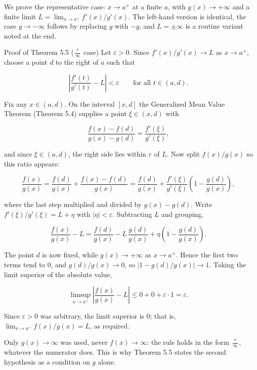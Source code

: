 \documentclass[a4paper,12pt,oneside]{memoir}
\begin{document}
We prove the representative case: \(x \to a^{+}\) at a finite \(a\), with \(g(x) \to +\infty\) and a finite limit \(L = \lim_{x \to a^{+}} f'(x)/g'(x)\). The left-hand version is identical, the case \(g \to -\infty\) follows by replacing \(g\) with \(-g\), and \(L = \pm\infty\) is a routine variant noted at the end.

\begin{envproof}{Proof of Theorem 5.5 (\(\tfrac{\ast}{\infty}\) case)}{}{}
Let \(\varepsilon > 0\). Since \(f'(x)/g'(x) \to L\) as \(x \to a^{+}\), choose a point \(d\) to the right of \(a\) such that

\[ \left\lvert \frac{f'(t)}{g'(t)} - L \right\rvert < \varepsilon \qquad \text{for all } t \in (a, d). \]

Fix any \(x \in (a, d)\). On the interval \([x, d]\) the Generalized Mean Value Theorem (Theorem 5.4) supplies a point \(\xi \in (x, d)\) with

\[ \frac{f(x) - f(d)}{g(x) - g(d)} = \frac{f'(\xi)}{g'(\xi)}, \]

and since \(\xi \in (a, d)\), the right side lies within \(\varepsilon\) of \(L\). Now split \(f(x)/g(x)\) so this ratio appears:

\[ \frac{f(x)}{g(x)} = \frac{f(d)}{g(x)} + \frac{f(x) - f(d)}{g(x)} = \frac{f(d)}{g(x)} + \frac{f'(\xi)}{g'(\xi)}\left(1 - \frac{g(d)}{g(x)}\right), \]

where the last step multiplied and divided by \(g(x) - g(d)\). Write \(f'(\xi)/g'(\xi) = L + \eta\) with \(\lvert \eta \rvert < \varepsilon\). Subtracting \(L\) and grouping,

\[ \frac{f(x)}{g(x)} - L = \frac{f(d)}{g(x)} - L\,\frac{g(d)}{g(x)} + \eta\left(1 - \frac{g(d)}{g(x)}\right). \]

The point \(d\) is now fixed, while \(g(x) \to +\infty\) as \(x \to a^{+}\). Hence the first two terms tend to \(0\), and \(g(d)/g(x) \to 0\), so \(\lvert 1 - g(d)/g(x) \rvert \to 1\). Taking the limit superior of the absolute value,

\[ \limsup_{x \to a^{+}} \left\lvert \frac{f(x)}{g(x)} - L \right\rvert \le 0 + 0 + \varepsilon \cdot 1 = \varepsilon. \]

Since \(\varepsilon > 0\) was arbitrary, the limit superior is \(0\); that is, \(\lim_{x \to a^{+}} f(x)/g(x) = L\), as required. \qedmark
\end{envproof}
\begin{informal}
Only \(g(x) \to \infty\) was used, never \(f(x) \to \infty\): the rule holds in the form \(\tfrac{\ast}{\infty}\), whatever the numerator does. This is why Theorem 5.5 states the second hypothesis as a condition on \(g\) alone.
\end{informal}
\end{document}
